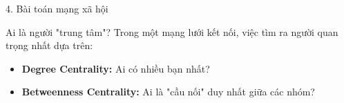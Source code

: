 \documentclass[11pt]{beamer}
\newenvironment{mainbox}[1]{\begin{block}{#1}}{\end{block}}
\begin{document}
\begin{frame}{4. Bài toán mạng xã hội}
    \begin{mainbox}{Ai là người "trung tâm"?}
        Trong một mạng lưới kết nối, việc tìm ra người quan trọng nhất dựa trên:
        \begin{itemize}
            \item \textbf{Degree Centrality:} Ai có nhiều bạn nhất?
            \item \textbf{Betweenness Centrality:} Ai là "cầu nối" duy nhất giữa các nhóm?
        \end{itemize}
    \end{mainbox}
    \vspace{0.3cm}
    \begin{center}
    \end{center}
\end{frame}
\end{document}
